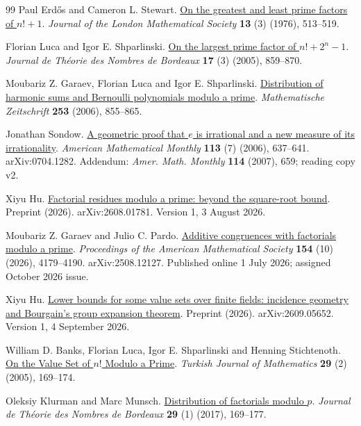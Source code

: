 \begin{thebibliography}{99}
Paul Erd{\H o}s and Cameron L. Stewart. \href{https://doi.org/10.1112/jlms/s2-13.3.513}{On the greatest and least prime factors of {$n!+1$}}.
\emph{Journal of the London Mathematical Society} \textbf{13} (3) (1976), 513--519.

Florian Luca and Igor E. Shparlinski. \href{https://doi.org/10.5802/jtnb.524}{On the largest prime factor of {$n!+2^n-1$}}.
\emph{Journal de Th{\'e}orie des Nombres de Bordeaux} \textbf{17} (3) (2005), 859--870.

Moubariz Z. Garaev, Florian Luca and Igor E. Shparlinski. \href{https://doi.org/10.1007/s00209-006-0939-5}{Distribution of harmonic sums and {Bernoulli} polynomials modulo a prime}.
\emph{Mathematische Zeitschrift} \textbf{253} (2006), 855--865.

Jonathan Sondow. \href{https://arxiv.org/abs/0704.1282v2}{A geometric proof that {$e$} is irrational and a new measure of its irrationality}.
\emph{American Mathematical Monthly} \textbf{113} (7) (2006), 637--641. arXiv:0704.1282. Addendum: \emph{Amer. Math. Monthly} \textbf{114} (2007), 659; reading copy v2.

Xiyu Hu. \href{https://arxiv.org/abs/2608.01781v1}{Factorial residues modulo a prime: beyond the square-root bound}.
Preprint (2026). arXiv:2608.01781. Version 1, 3 August 2026.

Moubariz Z. Garaev and Julio C. Pardo. \href{https://doi.org/10.1090/proc/17753}{Additive congruences with factorials modulo a prime}.
\emph{Proceedings of the American Mathematical Society} \textbf{154} (10) (2026), 4179--4190. arXiv:2508.12127. Published online 1 July 2026; assigned October 2026 issue.

Xiyu Hu. \href{https://arxiv.org/abs/2609.05652v1}{Lower bounds for some value sets over finite fields: incidence geometry and {Bourgain}'s group expansion theorem}.
Preprint (2026). arXiv:2609.05652. Version 1, 4 September 2026.

William D. Banks, Florian Luca, Igor E. Shparlinski and Henning Stichtenoth. \href{https://journals.tubitak.gov.tr/math/vol29/iss2/6/}{On the Value Set of $n!$ Modulo a Prime}.
\emph{Turkish Journal of Mathematics} \textbf{29} (2) (2005), 169--174.

Oleksiy Klurman and Marc Munsch. \href{https://doi.org/10.5802/jtnb.974}{Distribution of factorials modulo $p$}.
\emph{Journal de Théorie des Nombres de Bordeaux} \textbf{29} (1) (2017), 169--177.


\end{thebibliography}
